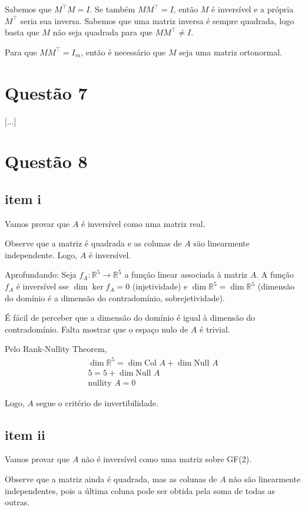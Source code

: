 \documentclass{article}
\newcommand{\Null}[1]{\textrm{Null } #1}
\newcommand{\Col}[1]{\textrm{Col } #1}
\newcommand{\nullity}[1]{\textrm{nullity } #1}
\begin{document}
Sabemos que $M^\intercal M = I$. Se também $M M^\intercal = I$, então $M$ é inversível e a própria $M^\intercal$ seria sua inversa.
Sabemos que uma matriz inversa é sempre quadrada, logo basta que $M$ não seja quadrada para que $M M^\intercal \neq I$.

Para que $M M^\intercal = I_m$, então é necessário que $M$ seja uma matriz ortonormal.


\section*{Questão 7}
[...]


\section*{Questão 8}
\subsection*{item i}
Vamos provar que $A$ é inversível como uma matriz real.

Observe que a matriz é quadrada e as colunas de $A$ são linearmente independente.
Logo, $A$ é inversível.
\medskip

Aprofundando: Seja $f_A: \mathbb{R}^5 \to \mathbb{R}^5$ a função linear associada à matriz $A$.
A função $f_A$ é inversível sse $\dim \ker f_A = 0$ (injetividade) e $\dim \mathbb{R}^5 = \dim \mathbb{R}^5$ (dimensão do domínio é a dimensão do contradomínio, sobrejetividade).

É fácil de perceber que a dimensão do domínio é igual à dimensão do contradomínio. Falta mostrar que o espaço nulo de $A$ é trivial.

Pelo Rank-Nullity Theorem, 
\begin{align*}
    \dim \mathbb{R}^5 = \dim \Col{A} + \dim \Null{A}\\
    5 = 5 + \dim \Null{A}\\
    \nullity{A} = 0
\end{align*}

Logo, $A$ segue o critério de invertibilidade.


\subsection*{item ii}
Vamos provar que $A$ não é inversível como uma matriz sobre GF(2).

Observe que a matriz ainda é quadrada, mas as colunas de $A$ não são linearmente independentes, pois a última coluna pode ser obtida pela soma de todas as outras.
\end{document}

